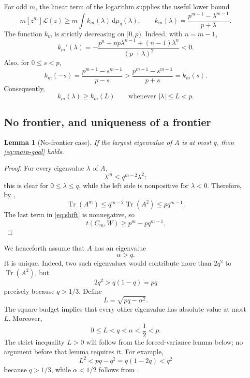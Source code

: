 \documentclass[11pt]{article}
\newtheorem{lemma}[theorem]{Lemma}
\newcommand{\Tr}{\operatorname{Tr}}
\newcommand{\cL}{\mathcal L}
\newcommand{\dd}{\,\mathrm d}
\begin{document}
For odd \(m\), the linear term of the logarithm supplies the useful lower
bound
\begin{equation}\label{eq:linear-shift-lower}
 m[z^m]\cL(z)
 \ge m\int k_m(\lambda)\dd\mu_g(\lambda),
 \qquad
 k_m(\lambda)=\frac{p^{m-1}-\lambda^{m-1}}{p+\lambda}.
\end{equation}
The function \(k_m\) is strictly decreasing on \([0,p)\).  Indeed, with
\(n=m-1\),
\[
 k_m'(\lambda)
 =-\frac{p^n+np\lambda^{n-1}+(n-1)\lambda^n}{(p+\lambda)^2}<0.
\]
Also, for \(0\le s<p\),
\[
       k_m(-s)=\frac{p^{m-1}-s^{m-1}}{p-s}
       >\frac{p^{m-1}-s^{m-1}}{p+s}=k_m(s).
\]
Consequently,
\begin{equation}\label{eq:k-safe}
       k_m(\lambda)\ge k_m(L)
       \qquad\text{whenever }|\lambda|\le L<p.
\end{equation}

\subsection{No frontier, and uniqueness of a frontier}

\begin{lemma}[No-frontier case]\label{lem:no-frontier}
If the largest eigenvalue of \(A\) is at most \(q\), then
\eqref{eq:main-goal} holds.
\end{lemma}

\begin{proof}
For every eigenvalue \(\lambda\) of \(A\),
\[
       \lambda^m\le q^{m-2}\lambda^2:
\]
this is clear for \(0\le\lambda\le q\), while the left side is nonpositive
for \(\lambda<0\).  Therefore, by ,
\[
       \Tr(A^m)\le q^{m-2}\Tr(A^2)\le pq^{m-1}.
\]
The last term in \eqref{eq:shift} is nonnegative, so
\[
       t(C_m,W)\ge p^m-pq^{m-1}.
\]
\end{proof}

We henceforth assume that \(A\) has an eigenvalue
\begin{equation}\label{eq:alpha-frontier}
       \alpha>q.
\end{equation}
It is unique.  Indeed, two such eigenvalues would contribute more than
\(2q^2\) to \(\Tr(A^2)\), but
\[
       2q^2>q(1-q)=pq
\]
precisely because \(q>1/3\).  Define
\begin{equation}\label{eq:L-def}
       L=\sqrt{pq-\alpha^2}.
\end{equation}
The square budget implies that every other eigenvalue has absolute value at
most \(L\).  Moreover,
\begin{equation}\label{eq:L-order}
       0\le L<q<\alpha<\frac12<p.
\end{equation}
The strict inequality \(L>0\) will follow from the forced-variance lemma
below; no argument before that lemma requires it.
For example,
\[
 L^2<pq-q^2=q(1-2q)<q^2
\]
because \(q>1/3\), while \(\alpha<1/2\) follows from
.
\end{document}
